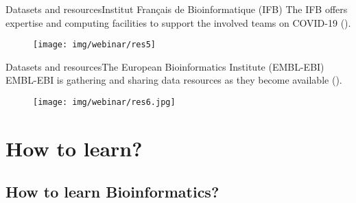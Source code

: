 \documentclass[10pt]{beamer}
\newcommand{\1}{
        	\setbeamertemplate{background}{
        		\texttt{[image: img/1]}
        		\tikz[overlay] \fill[fill opacity=0.75,fill=white] (0,0) rectangle (-\paperwidth,\paperheight);
        	}
}
\begin{document}
\begin{frame}{Datasets and resources}{Institut Français de Bioinformatique (IFB)}
	The IFB offers expertise and computing facilities to support the involved teams on COVID-19 (\href{https://www.france-bioinformatique.fr/en/action-covid-19}{}).
	\begin{figure}[]
		\centering
		\texttt{[image: img/webinar/res5]}				
	\end{figure}	
\end{frame}

\begin{frame}{Datasets and resources}{The European Bioinformatics Institute (EMBL-EBI)}
	EMBL-EBI is gathering and sharing data resources as they become available (\href{https://www.ebi.ac.uk/about/news/announcements/coronavirus-data}{}).
	\begin{figure}[]
		\centering
		\texttt{[image: img/webinar/res6.jpg]}				
	\end{figure}	
\end{frame}


\section{How to learn?}

\subsection{How to learn Bioinformatics?}
\end{document}
